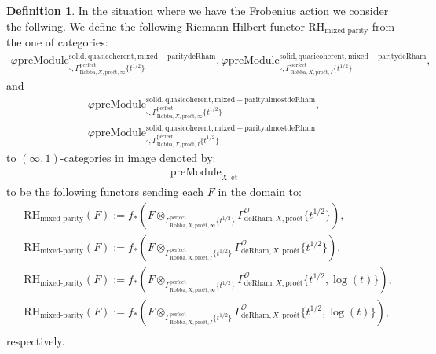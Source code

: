 \documentclass[12pt]{book}
\theoremstyle{definition}
\newtheorem{definition}{Definition}
\begin{document}
\begin{definition}
In the situation where we have the Frobenius action we consider the follwing. We define the following Riemann-Hilbert functor $\text{RH}_\text{mixed-parity}$ from the one of categories:
\begin{align}
\varphi\mathrm{preModule}^\mathrm{solid,quasicoherent,mixed-paritydeRham}_{\square,\Gamma^\mathrm{perfect}_{\text{Robba},X,\text{pro\'et},\infty}\{t^{1/2}\}},
\varphi\mathrm{preModule}^\mathrm{solid,quasicoherent,mixed-paritydeRham}_{\square,\Gamma^\mathrm{perfect}_{\text{Robba},X,\text{pro\'et},I}\{t^{1/2}\}}, 
\end{align}
and
\begin{align}
\varphi\mathrm{preModule}^\mathrm{solid,quasicoherent,mixed-parityalmostdeRham}_{\square,\Gamma^\mathrm{perfect}_{\text{Robba},X,\text{pro\'et},\infty}\{t^{1/2}\}},\\
\varphi\mathrm{preModule}^\mathrm{solid,quasicoherent,mixed-parityalmostdeRham}_{\square,\Gamma^\mathrm{perfect}_{\text{Robba},X,\text{pro\'et},I}\{t^{1/2}\}} 
\end{align}
to $(\infty,1)$-categories in image denoted by:
\begin{align}
\mathrm{preModule}_{X,\text{\'et}}
\end{align}
to be the following functors sending each $F$ in the domain to:
\begin{align}
&\text{RH}_\text{mixed-parity}(F):=f_*(F\otimes_{\Gamma^\mathrm{perfect}_{\text{Robba},X,\text{pro\'et},\infty}\{t^{1/2}\}} \Gamma^\mathcal{O}_{\text{deRham},X,\text{pro\'et}}\{t^{1/2}\}),\\
&\text{RH}_\text{mixed-parity}(F):=f_*(F\otimes_{\Gamma^\mathrm{perfect}_{\text{Robba},X,\text{pro\'et},I}\{t^{1/2}\}} \Gamma^\mathcal{O}_{\text{deRham},X,\text{pro\'et}}\{t^{1/2}\}),\\
&\text{RH}_\text{mixed-parity}(F):=f_*(F\otimes_{\Gamma^\mathrm{perfect}_{\text{Robba},X,\text{pro\'et},\infty}\{t^{1/2}\}} \Gamma^\mathcal{O}_{\text{deRham},X,\text{pro\'et}}\{t^{1/2},\log(t)\}),\\
&\text{RH}_\text{mixed-parity}(F):=f_*(F\otimes_{\Gamma^\mathrm{perfect}_{\text{Robba},X,\text{pro\'et},I}\{t^{1/2}\}} \Gamma^\mathcal{O}_{\text{deRham},X,\text{pro\'et}}\{t^{1/2},\log(t)\}),\\
\end{align}
respectively.

\end{definition}
\end{document}
